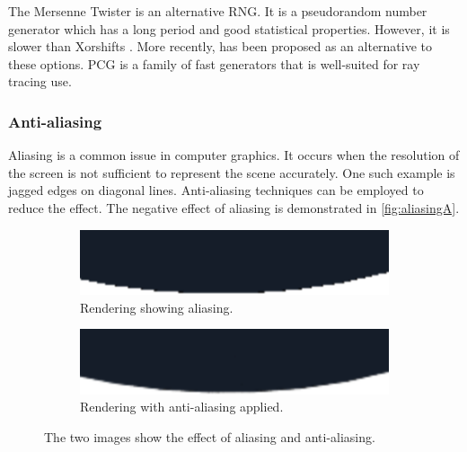 The Mersenne Twister \cite{rngMersenneTwister} is an alternative \gls{RNG}. It is a pseudorandom number generator which has a long period and good statistical properties. However, it is slower than Xorshifts \cite{o2014pcg}. More recently,  has been proposed as an alternative to these options. \gls{PCG} is a family of fast generators that is well-suited for ray tracing use.

\subsubsection{Anti-aliasing}
\label{sec:anti-aliasing}

Aliasing is a common issue in computer graphics. It occurs when the resolution of the screen is not sufficient to represent the scene accurately. One such example is jagged edges on diagonal lines. Anti-aliasing techniques can be employed to reduce the effect. The negative effect of aliasing is demonstrated in \autoref{fig:aliasingA}.

\begin{figure}[H]
  \centering
  \begin{subfigure}[b]{0.45\textwidth}
    \includegraphics[width=\textwidth]{resources/aliasing.png}
    \caption{Rendering showing aliasing.}
    \label{fig:aliasingA}
  \end{subfigure}
  \hfill
  \begin{subfigure}[b]{0.45\textwidth}
    \includegraphics[width=\textwidth]{resources/anti-aliasing.png}
    \caption{Rendering with anti-aliasing applied.}
    \label{fig:aliasingB}
  \end{subfigure}
  \caption{The two images show the effect of aliasing and anti-aliasing.}
  \label{fig:aliasing}
\end{figure}

